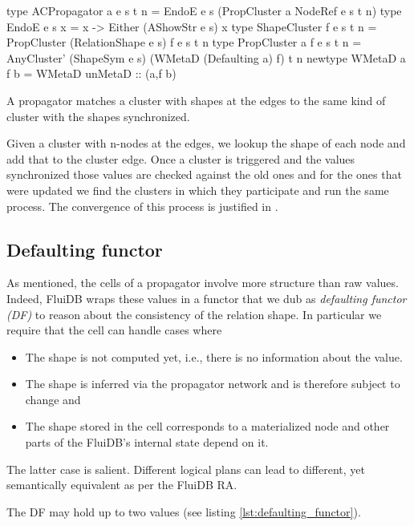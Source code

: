 \begin{code}
  \begin{haskellcode}
    type ACPropagator a e s t n =
      EndoE e s (PropCluster a NodeRef e s t n)
    type EndoE e s x = x -> Either (AShowStr e s) x
    type ShapeCluster f e s t n =
      PropCluster (RelationShape e s) f e s t n
    type PropCluster a f e s t n =
      AnyCluster' (ShapeSym e s) (WMetaD (Defaulting a) f) t n
    newtype WMetaD a f b = WMetaD { unMetaD :: (a,f b)}
  \end{haskellcode}
  \caption{\label{lst:acpropagator}A propagator matches a cluster with
    shapes at the edges to the same kind of cluster with the shapes
    synchronized.}
\end{code}

Given a cluster with n-nodes at the edges, we lookup the shape of each
node and add that to the cluster edge.  Once a cluster is triggered
and the values synchronized those values are checked against the old
ones and for the ones that were updated we find the clusters in which
they participate and run the same process. The convergence of this
process is justified in \cite{kuperLVarsLatticebasedData2013}.

\subsection{Defaulting functor}

As mentioned, the cells of a propagator involve more structure than
raw values. Indeed, FluiDB wraps these values in a functor that we dub
as \emph{defaulting functor (DF)} to reason about the consistency of
the relation shape. In particular we require that the cell can handle
cases where

\begin{itemize}
\item The shape is not computed yet, i.e., there is no information
  about the value.
\item The shape is inferred via the propagator network and is
therefore subject to change and
\item The shape stored in the cell corresponds to a materialized node
and other parts of the FluiDB's internal state depend on it.
\end{itemize}

The latter case is salient. Different logical plans can lead to
different, yet semantically equivalent as per the FluiDB RA.

The DF may hold up to two values (see listing
\ref{lst:defaulting_functor}).

